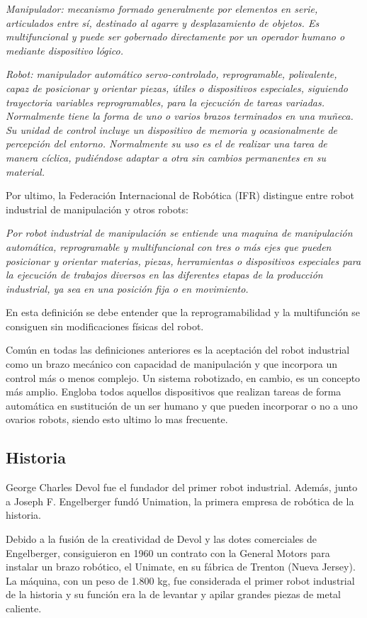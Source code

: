 \documentclass[12pt,a4paper]{report}
\begin{document}
\emph{Manipulador: mecanismo formado generalmente por elementos en serie, articulados
entre sí, destinado al agarre y desplazamiento de objetos. Es multifuncional y
puede ser gobernado directamente por un operador humano o mediante dispositivo
lógico.}

\emph{Robot: manipulador automático servo-controlado, reprogramable, polivalente,
capaz de posicionar y orientar piezas, útiles o dispositivos especiales,
siguiendo trayectoria variables reprogramables, para la ejecución de tareas
variadas. Normalmente tiene la forma de uno o varios brazos terminados en una
muñeca. Su unidad de control incluye un dispositivo de memoria y ocasionalmente
de percepción del entorno. Normalmente su uso es el de realizar una tarea de
manera cíclica, pudiéndose adaptar a otra sin cambios permanentes en su
material.}

Por ultimo, la Federación Internacional de Robótica (IFR) distingue entre robot
industrial de manipulación y otros robots:

\emph{Por robot industrial de manipulación se entiende una maquina de manipulación
automática, reprogramable y multifuncional con tres o más ejes que pueden
posicionar y orientar materias, piezas, herramientas o dispositivos especiales
para la ejecución de trabajos diversos en las diferentes etapas de la producción
industrial, ya sea en una posición fija o en movimiento.}

En esta definición se debe entender que la reprogramabilidad y la multifunción
se consiguen sin modificaciones físicas del robot.

Común en todas las definiciones anteriores es la aceptación del robot industrial
como un brazo mecánico con capacidad de manipulación y que incorpora un control
más o menos complejo. Un sistema robotizado, en cambio, es un concepto más
amplio. Engloba todos aquellos dispositivos que realizan tareas de forma
automática en sustitución de un ser humano y que pueden incorporar o no a uno
ovarios robots, siendo esto ultimo lo mas frecuente.

\subsection{Historia}

George Charles Devol fue el fundador del primer robot industrial.
Además, junto a Joseph F. Engelberger fundó Unimation, la primera empresa de
robótica de la historia.

Debido a la fusión de la creatividad de Devol y las dotes comerciales de
Engelberger, consiguieron en 1960 un contrato con la General Motors para
instalar un brazo robótico, el Unimate, en su fábrica de Trenton (Nueva Jersey).
La máquina, con un peso de 1.800 kg, fue considerada el primer robot industrial
de la historia y su función era la de levantar y apilar grandes piezas de metal
caliente.
\end{document}
